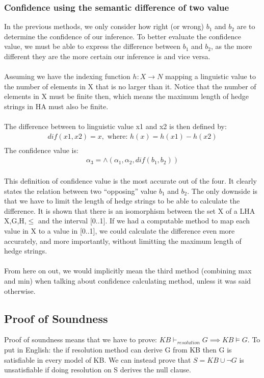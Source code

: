\documentclass[part1.tex]{subfiles}
\begin{document}
\subsubsection{Confidence using the semantic difference of two value}
In the previous methods, we only consider how right (or wrong) \(b_1\) and \(b_2\) are to determine
the confidence of our inference. To better evaluate the confidence value, we must be able to express
the difference between \(b_1\) and \(b_2\), as the more different they are the more certain our 
inference is and vice versa.\\
\\
Assuming we have the indexing function \(h: X \to N\) mapping a linguistic value to the number of 
elements in X that is no larger than it. Notice that the number of elements in X must be finite then, 
which means the maximum length of hedge strings in HA must also be finite.\\ 
\\
The difference between to linguistic value x1 and x2 is then defined by:
\begin{align*}
	dif(x1,x2) = x, \text{ where: } h(x) = h(x1) - h(x2)\\
\end{align*}
The confidence value is:
\begin{align*}
	\alpha_3 = \wedge(\alpha_1,\alpha_2,dif(b_1,b_2))
\end{align*}
\\
This definition of confidence value is the most accurate out of the four. It clearly states the relation
between two ``opposing'' value \(b_1\) and \(b_2\). The only downside is that we have to limit the 
length of hedge strings to be able to calculate the difference. It is shown that there is an 
isomorphism between the set X of a LHA {X,G,H,\(\le\)} and the interval [0..1]. If we had a computable
method to map each value in X to a value in [0..1], we could calculate the difference even more 
accurately, and more importantly, without limitting the maximum length of hedge strings.\\

\paragraph{}From here on out, we would implicitly mean the third method
(combining max and min) when talking about confidence calculating
method, unless it was said otherwise.


\subsection{Proof of Soundness}
Proof of soundness means that we have to prove: \(KB {\vdash}_{resolution} G \implies KB \models G\). To
put in English: the if resolution method can derive G from KB then G is satisfiable in every model of 
KB. We can instead prove that \(S = KB \cup \neg G\) is unsatisfiable if doing resolution on
S derives the null clause.\\
\end{document}
